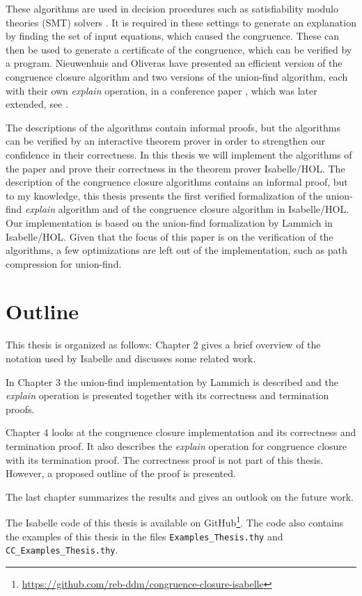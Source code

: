 These algorithms are used in decision procedures such as satisfiability modulo theories (SMT) solvers \cite{z3}. It is required in these settings to generate an explanation by finding the set of input equations, which caused the congruence. These can then be used to generate a certificate of the congruence, which can be verified by a program. Nieuwenhuis and Oliveras have presented an efficient version of the congruence closure algorithm and two versions of the union-find algorithm, each with their own \emph{explain} operation, in a conference paper \cite{Nieuwenhuis}, which was later extended, see \cite{Nieuwenhuis2}.

The descriptions of the algorithms contain informal proofs, but the algorithms can be verified by an interactive theorem prover in order to strengthen our confidence in their correctness. In this thesis we will implement the algorithms of the paper \cite{Nieuwenhuis} and prove their correctness in the theorem prover Isabelle/HOL. The description of the congruence closure algorithms contains an informal proof, but to my knowledge, this thesis presents the first verified formalization of the union-find \emph{explain} algorithm and of the congruence closure algorithm in Isabelle/HOL. Our implementation is based on the union-find formalization by Lammich \cite{unionfind-isabelle} in Isabelle/HOL. Given that the focus of this paper is on the verification of the algorithms, a few optimizations are left out of the implementation, such as path compression for union-find.


\section{Outline}
This thesis is organized as follows: Chapter 2 gives a brief overview of the notation used by Isabelle and discusses some related work.

In Chapter 3 the union-find implementation by Lammich \cite{unionfind-isabelle} is described and the \emph{explain} operation is presented together with its correctness and termination proofs.

Chapter 4 looks at the congruence closure implementation and its correctness and termination proof. It also describes the \emph{explain} operation for congruence closure with its termination proof. The correctness proof is not part of this thesis. However, a proposed outline of the proof is presented.

The last chapter summarizes the results and gives an outlook on the future work.

The Isabelle code of this thesis is available on GitHub\footnote{\url{https://github.com/reb-ddm/congruence-closure-isabelle}}.
The code also contains the examples of this thesis in the files \lstinline|Examples_Thesis.thy| and \lstinline|CC_Examples_Thesis.thy|.

